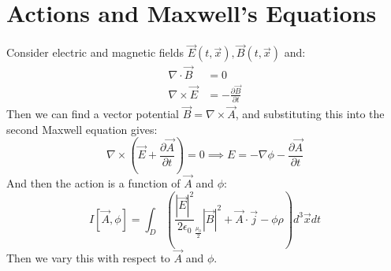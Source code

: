 \documentclass[../Main.tex]{subfiles}
\begin{document}
\section{Actions and Maxwell's Equations}
Consider electric and magnetic fields $\vec{E}(t, \vec{x}), \vec{B}(t, \vec{x})$ and:
\begin{align*}
    \nabla \cdot \vec{B} &= 0 \\
    \nabla \times \vec{E} &= -\frac{\partial \vec{B}}{\partial t}
\end{align*}
Then we can find a vector potential $\vec{B} = \nabla \times \vec{A}$, and substituting this into the second Maxwell equation gives:
\begin{equation*}
    \nabla \times (\vec{E} + \frac{\partial \vec{A}}{\partial t}) = 0 \implies E = -\nabla \phi - \frac{\partial \vec{A}}{\partial t}
\end{equation*}
And then the action is a function of $\vec{A}$ and $\phi$:
\begin{equation*}
    I[\vec{A}, \phi] = \int_D \left(\frac{|\vec{E}|^2}{2\epsilon_0} _ \frac{\mu_0}{2}|\vec{B}|^2 + \vec{A} \cdot \vec{j} - \phi \rho\right) d^3\vec{x} dt
\end{equation*}
Then we vary this with respect to $\vec{A}$ and $\phi$.

\end{document}
